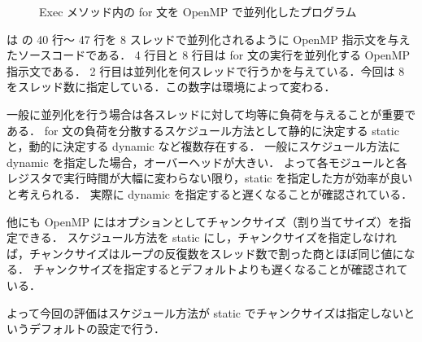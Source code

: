 \begin{figure}[t]
 
 \caption{Exec メソッド内の for 文を OpenMP で並列化したプログラム}
 \label{src:exec_openmp}
\end{figure}

 は の 40 行〜 47 行を 8 スレッドで並列化されるように OpenMP 指示文を与えたソースコードである．
4 行目と 8 行目は for 文の実行を並列化する OpenMP 指示文である．
2 行目は並列化を何スレッドで行うかを与えている．今回は 8 をスレッド数に指定している．この数字は環境によって変わる．

一般に並列化を行う場合は各スレッドに対して均等に負荷を与えることが重要である．
for 文の負荷を分散するスケジュール方法として静的に決定する static と，動的に決定する dynamic など複数存在する．
一般にスケジュール方法に dynamic を指定した場合，オーバーヘッドが大きい．
よって各モジュールと各レジスタで実行時間が大幅に変わらない限り，static を指定した方が効率が良いと考えられる．
実際に dynamic を指定すると遅くなることが確認されている．

他にも OpenMP にはオプションとしてチャンクサイズ（割り当てサイズ）を指定できる．
スケジュール方法を static にし，チャンクサイズを指定しなければ，チャンクサイズはループの反復数をスレッド数で割った商とほぼ同じ値になる．
チャンクサイズを指定するとデフォルトよりも遅くなることが確認されている．

よって今回の評価はスケジュール方法が static でチャンクサイズは指定しないというデフォルトの設定で行う．
